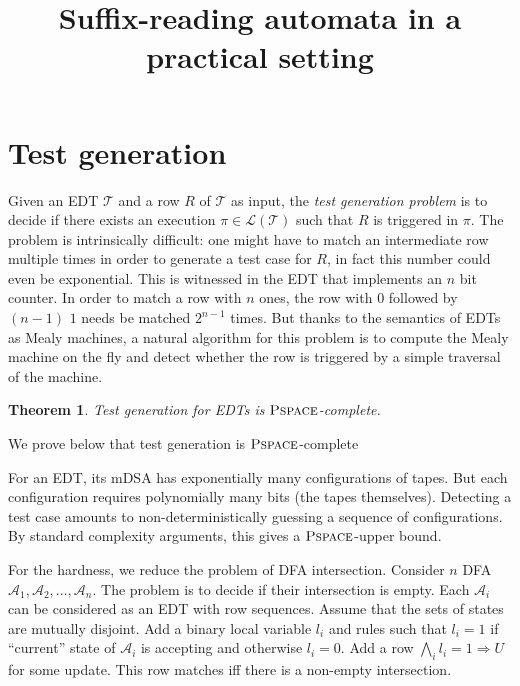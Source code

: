 \documentclass[a4paper, 11pt]{llncs}
\newtheorem{theorem}{Theorem}
\newcommand{\Aa}{\mathcal{A}}
\newcommand{\Ll}{\mathcal{L}}
\newcommand{\imp}{\Rightarrow}
\newcommand{\Land}{\bigwedge}
\newcommand{\PSPACE}{\operatorname{\textsc{Pspace}}}
\newcommand{\Tt}{\mathcal{T}}
\begin{document}
\title{Suffix-reading automata in a practical setting}

\maketitle





\section{Test generation}
\label{sec:test-generation}

Given an EDT $\Tt$ and a row $R$ of $\Tt$ as input, the \emph{test
  generation problem} is to decide if there exists an execution
$\pi \in \Ll(\Tt)$ such that $R$ is triggered in $\pi$.
%
The problem is
intrinsically difficult: one might have to match an intermediate row
multiple times in order to generate a test case for $R$, in fact this
number could even be exponential. This is witnessed in the EDT that
implements an $n$ bit counter. In order to match a row with $n$ ones,
the row with $0$ followed by $(n-1)$ $1$ needs be matched $2^{n-1}$
times. 
%
But thanks to the semantics of EDTs as Mealy machines, a natural
algorithm for this problem is to compute the Mealy machine 
on the fly and detect whether the row is triggered by a simple
traversal of the machine.


\begin{theorem}
  \label{thm:test-generation-PSPACE}
  Test generation for EDTs is $\PSPACE$-complete.
\end{theorem}

We prove below that test generation is $\PSPACE$-complete

For an EDT, its mDSA has exponentially many
configurations of tapes. But each configuration requires polynomially many bits (the tapes themselves). Detecting a test
case amounts to non-deterministically guessing a sequence of configurations. By standard complexity arguments, this gives a
$\PSPACE$-upper bound. %

For the hardness, we reduce the problem of DFA
intersection. Consider $n$ DFA $\Aa_1, \Aa_2, \dots, \Aa_n$. The
problem is to decide if their intersection is empty. Each $\Aa_i$
can be considered as an EDT with row sequences. Assume that the sets
of states are mutually disjoint. Add a binary local variable $l_i$ and rules
such that $l_i = 1$ if ``current'' state of $\Aa_i$ is accepting and
otherwise $l_i = 0$. Add a row $\Land_i l_i = 1 \imp U$ for some
update. This row matches iff there is a non-empty intersection.
\end{document}
